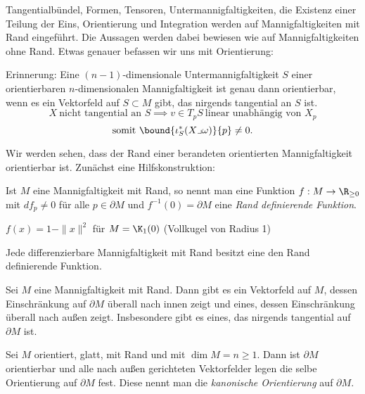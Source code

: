 \begin{rem*}\lecture
	Tangentialbündel, Formen, Tensoren, Untermannigfaltigkeiten, die Existenz einer Teilung der Eins, Orientierung und Integration werden auf Mannigfaltigkeiten mit Rand eingeführt. Die Aussagen werden dabei bewiesen wie auf Mannigfaltigkeiten ohne Rand. Etwas genauer befassen wir uns mit Orientierung:
\end{rem*}

Erinnerung: Eine $(n-1)$-dimensionale Untermannigfaltigkeit $S$ einer orientierbaren $n$-dimensionalen Mannigfaltigkeit ist genau dann orientierbar, wenn es ein Vektorfeld auf $S \subset M$ gibt, das nirgends tangential an $S$ ist.
\[ X \ \text{nicht tangential an } S \implies v \in T_pS \ \text{linear unabhängig von } X_p \]
\[\text{somit } \bound{\iota_S^*(X \lrcorner \omega)}{p} \neq 0.\]

Wir werden sehen, dass der Rand einer berandeten orientierten Mannigfaltigkeit orientierbar ist. Zunächst eine Hilfskonstruktion:

\begin{defn*}
	Ist $M$ eine Mannigfaltigkeit mit Rand, so nennt man eine Funktion \( f: M \to \R_{\geq 0} \) mit $df_p \neq 0$ für alle $p \in \partial M$ und \( f^{-1}(0) = \partial M \) eine \emph{Rand definierende Funktion}.
\end{defn*}

\begin{exmp*}
	\( f(x)  = 1 - \|x\|^2 \) für $M = \K_1(0)$ (Vollkugel von Radius 1)
\end{exmp*}

\begin{lem}\autolabel
	Jede differenzierbare Mannigfaltigkeit mit Rand besitzt eine den Rand definierende Funktion.
\end{lem}

\begin{lem}\autolabel
	Sei $M$ eine Mannigfaltigkeit mit Rand. Dann gibt es ein Vektorfeld auf $M$, dessen Einschränkung auf $\partial M$ überall nach innen zeigt und eines, dessen Einschränkung überall nach außen zeigt. Insbesondere gibt es eines, das nirgends tangential auf $\partial M$ ist.
\end{lem}

\begin{lem}\autolabel
	Sei $M$ orientiert, glatt, mit Rand und mit $\dim M = n \geq 1$. Dann ist $\partial M$ orientierbar und alle nach außen gerichteten Vektorfelder legen die selbe Orientierung auf $\partial M$ fest. Diese nennt man die \emph{kanonische Orientierung} auf $\partial M$.
\end{lem}

